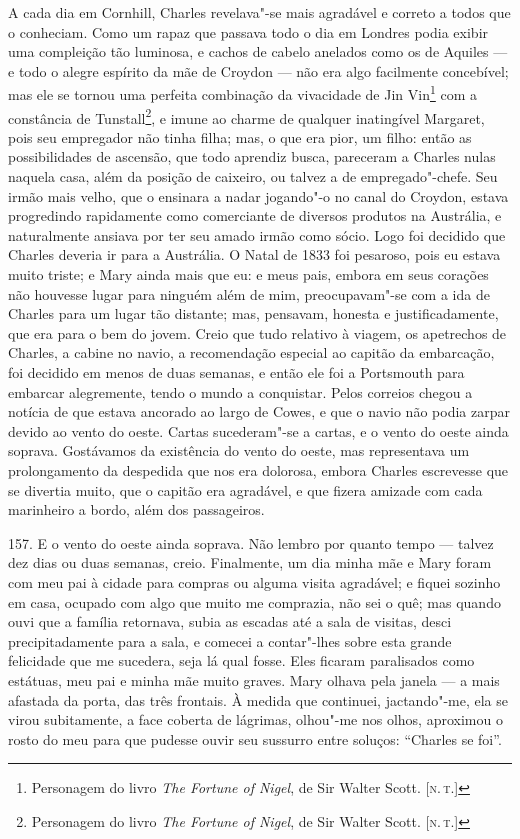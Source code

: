A cada dia em Cornhill, Charles revelava"-se mais agradável e correto a
todos que o conheciam. Como um rapaz que passava todo o dia em Londres
podia exibir uma compleição tão luminosa, e cachos de cabelo anelados
como os de Aquiles --- e todo o alegre espírito da mãe de Croydon --- não
era algo facilmente concebível; mas ele se tornou uma perfeita
combinação da vivacidade de Jin Vin\footnote{Personagem do livro
  \emph{The Fortune of Nigel}, de Sir Walter Scott. {[}\textsc{n.\,t.}{]}} com
a constância de Tunstall\footnote{Personagem do livro \emph{The Fortune
  of Nigel}, de Sir Walter Scott. {[}\textsc{n.\,t.}{]}}, e imune ao charme de
qualquer inatingível Margaret, pois seu empregador não tinha filha; mas,
o que era pior, um filho: então as possibilidades de ascensão, que todo
aprendiz busca, pareceram a Charles nulas naquela casa, além da posição
de caixeiro, ou talvez a de empregado"-chefe. Seu irmão mais velho, que o
ensinara a nadar jogando"-o no canal do Croydon, estava progredindo
rapidamente como comerciante de diversos produtos na Austrália, e
naturalmente ansiava por ter seu amado irmão como sócio. Logo foi
decidido que Charles deveria ir para a Austrália. O Natal de 1833 foi
pesaroso, pois eu estava muito triste; e Mary ainda mais que eu: e meus
pais, embora em seus corações não houvesse lugar para ninguém além de
mim, preocupavam"-se com a ida de Charles para um lugar tão distante;
mas, pensavam, honesta e justificadamente, que era para o bem do jovem.
Creio que tudo relativo à viagem, os apetrechos de Charles, a cabine no
navio, a recomendação especial ao capitão da embarcação, foi decidido em
menos de duas semanas, e então ele foi a Portsmouth para embarcar
alegremente, tendo o mundo a conquistar. Pelos correios chegou a notícia
de que estava ancorado ao largo de Cowes, e que o navio não podia zarpar
devido ao vento do oeste. Cartas sucederam"-se a cartas, e o vento do
oeste ainda soprava. Gostávamos da existência do vento do oeste, mas
representava um prolongamento da despedida que nos era dolorosa, embora
Charles escrevesse que se divertia muito, que o capitão era agradável, e
que fizera amizade com cada marinheiro a bordo, além dos passageiros.

157. E o vento do oeste ainda soprava. Não lembro por quanto tempo ---
talvez dez dias ou duas semanas, creio. Finalmente, um dia minha mãe e
Mary foram com meu pai à cidade para compras ou alguma visita agradável;
e fiquei sozinho em casa, ocupado com algo que muito me comprazia, não
sei o quê; mas quando ouvi que a família retornava, subia as escadas até
a sala de visitas, desci precipitadamente para a sala, e comecei a
contar"-lhes sobre esta grande felicidade que me sucedera, seja lá qual
fosse. Eles ficaram paralisados como estátuas, meu pai e minha mãe muito
graves. Mary olhava pela janela --- a mais afastada da porta, das três
frontais. À medida que continuei, jactando"-me, ela se virou subitamente,
a face coberta de lágrimas, olhou"-me nos olhos, aproximou o rosto do meu
para que pudesse ouvir seu sussurro entre soluços: ``Charles se foi''.

